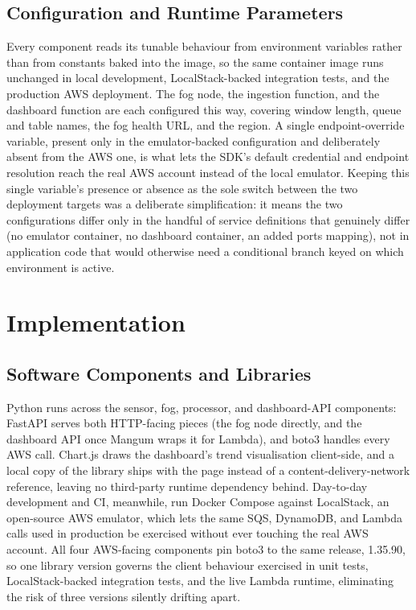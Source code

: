 \documentclass[conference]{IEEEtran}
\begin{document}
\subsection{Configuration and Runtime Parameters}
Every component reads its tunable behaviour from environment variables rather than from constants baked into the image, so the same container image runs unchanged in local development, LocalStack-backed integration tests, and the production AWS deployment. The fog node, the ingestion function, and the dashboard function are each configured this way, covering window length, queue and table names, the fog health URL, and the region. A single endpoint-override variable, present only in the emulator-backed configuration and deliberately absent from the AWS one, is what lets the SDK's default credential and endpoint resolution reach the real AWS account instead of the local emulator. Keeping this single variable's presence or absence as the sole switch between the two deployment targets was a deliberate simplification: it means the two configurations differ only in the handful of service definitions that genuinely differ (no emulator container, no dashboard container, an added ports mapping), not in application code that would otherwise need a conditional branch keyed on which environment is active.

\section{Implementation}

\subsection{Software Components and Libraries}
Python runs across the sensor, fog, processor, and dashboard-API components: FastAPI serves both HTTP-facing pieces (the fog node directly, and the dashboard API once Mangum wraps it for Lambda), and boto3 handles every AWS call. Chart.js draws the dashboard's trend visualisation client-side, and a local copy of the library ships with the page instead of a content-delivery-network reference, leaving no third-party runtime dependency behind. Day-to-day development and CI, meanwhile, run Docker Compose against LocalStack, an open-source AWS emulator, which lets the same SQS, DynamoDB, and Lambda calls used in production be exercised without ever touching the real AWS account. All four AWS-facing components pin boto3 to the same release, 1.35.90, so one library version governs the client behaviour exercised in unit tests, LocalStack-backed integration tests, and the live Lambda runtime, eliminating the risk of three versions silently drifting apart.
\end{document}
